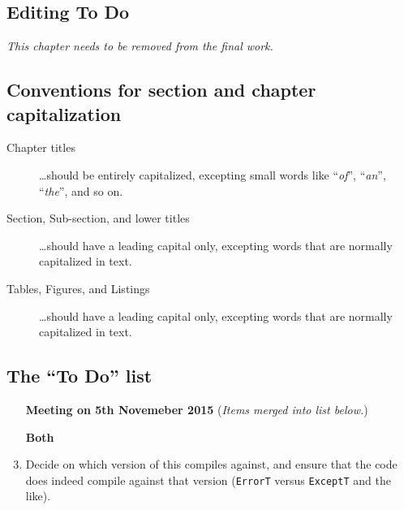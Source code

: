 
\begin{scope}
\nolinenumbers
\chapter{Editing To Do}\label{chap:to-do}

\textit{\color{red} This chapter needs to be removed from the final
  work.}

\section{Conventions for section and chapter capitalization}
\begin{description}
\item [Chapter titles]
  \dots should be entirely capitalized, excepting small words like
  ``\textit{of}'',
  ``\textit{an}'',
  ``\textit{the}'',
  and so on.
\item [Section, Sub-section, and lower titles]
  \dots should have a leading capital only, excepting words 
  that are normally capitalized in text.
\item [Tables, Figures, and Listings]
  \dots should have a leading capital only, excepting words 
  that are normally capitalized in text.
\end{description}

\section{The ``To Do'' list}

\begin{enumerate}
\item [\textbf{Meeting on 5th Novemeber 2015}]
  (\textit{Items merged into list below.})

\item [\textbf{Both}]

\item
  Decide on which version of  this compiles against, and ensure that the code does indeed compile 
  against that version (\Verb!ErrorT! versus \Verb!ExceptT! and the like).


\end{enumerate}
\end{scope}
